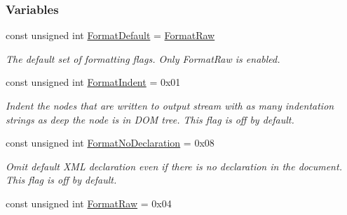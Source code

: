 \subsubsection*{Variables}
\begin{DoxyCompactItemize}
\item 
\hypertarget{namespacephys_1_1xml_a08bf6aab51f79929d9097706a5e64408}{
const unsigned int \hyperlink{namespacephys_1_1xml_a08bf6aab51f79929d9097706a5e64408}{FormatDefault} = \hyperlink{namespacephys_1_1xml_a6f6696cbdc48011817adad7978e83976}{FormatRaw}}
\label{namespacephys_1_1xml_a08bf6aab51f79929d9097706a5e64408}

\begin{DoxyCompactList}\small\item\em The default set of formatting flags. Only FormatRaw is enabled. \item\end{DoxyCompactList}\item 
\hypertarget{namespacephys_1_1xml_afaad0b8f59b5f103218ed5cb39b1bbde}{
const unsigned int \hyperlink{namespacephys_1_1xml_afaad0b8f59b5f103218ed5cb39b1bbde}{FormatIndent} = 0x01}
\label{namespacephys_1_1xml_afaad0b8f59b5f103218ed5cb39b1bbde}

\begin{DoxyCompactList}\small\item\em Indent the nodes that are written to output stream with as many indentation strings as deep the node is in DOM tree. This flag is off by default. \item\end{DoxyCompactList}\item 
\hypertarget{namespacephys_1_1xml_aee4ccb3535945d4808a0cf6abe4cb050}{
const unsigned int \hyperlink{namespacephys_1_1xml_aee4ccb3535945d4808a0cf6abe4cb050}{FormatNoDeclaration} = 0x08}
\label{namespacephys_1_1xml_aee4ccb3535945d4808a0cf6abe4cb050}

\begin{DoxyCompactList}\small\item\em Omit default XML declaration even if there is no declaration in the document. This flag is off by default. \item\end{DoxyCompactList}\item 
\hypertarget{namespacephys_1_1xml_a6f6696cbdc48011817adad7978e83976}{
const unsigned int \hyperlink{namespacephys_1_1xml_a6f6696cbdc48011817adad7978e83976}{FormatRaw} = 0x04}
\label{namespacephys_1_1xml_a6f6696cbdc48011817adad7978e83976}


\end{DoxyCompactItemize}
